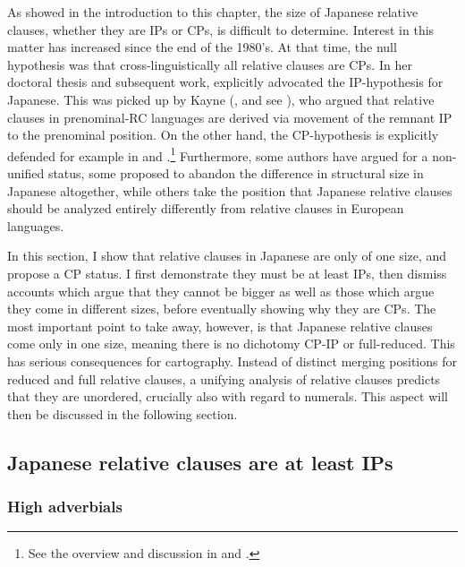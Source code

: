 \documentclass [output=book,colorlinks,citecolor=brown]{langscibook}
\begin{document}
As showed in the introduction to this chapter, the size of Japanese relative clauses, whether they are IPs or CPs, is difficult to determine. Interest in this matter has increased since the end of the 1980's. At that time, the null hypothesis was that cross-linguistically all relative clauses are CPs. In her doctoral thesis and subsequent work, \citet{murasugi:1991:noun, murasugi:2000:anti} explicitly advocated the IP-hypothesis for Japanese. This was picked up by Kayne (\citeyear{kayne:1994:anti}, and see \citealt{kayne:2005:japanese}), who argued that relative clauses in prenominal-RC languages are derived via movement of the remnant IP to the prenominal position. On the other hand, the CP-hypothesis is explicitly defended for example in \citet{kaplan:1995:the} and \citet{miyamoto:2017:RC}.\footnote{See the overview and discussion in \citet{hoshi:2004:para} and \citet{miyamoto:2017:RC}.} Furthermore, some authors \citep{krause:2001:rrc, miyagawa:2011:genitive, miyagawa:2012:case, miyagawa:2017:agreement} have argued for a non-unified status, some \citep{sells:2007:finiteness} proposed to abandon the difference in structural size in Japanese altogether, while others \citep{matsumoto:2017:japanese} take the position that Japanese relative clauses should be analyzed entirely differently from relative clauses in European languages. %

In this section, I show that relative clauses in Japanese are only of one size, and propose a CP status. I first demonstrate they must be at least IPs, then dismiss accounts which argue that they cannot be bigger as well as those which argue they come in different sizes, before eventually showing why they are CPs. The most important point to take away, however, is that Japanese relative clauses come only in one size, meaning there is no dichotomy CP-IP or full-reduced. This has serious consequences for cartography. Instead of distinct merging positions for reduced and full relative clauses, a unifying analysis of relative clauses predicts that they are unordered, crucially also with regard to numerals. This aspect will then be discussed in the following section.

\subsection{Japanese relative clauses are at least IPs} \label{cinque adj}

\subsubsection{High adverbials}
\end{document}
